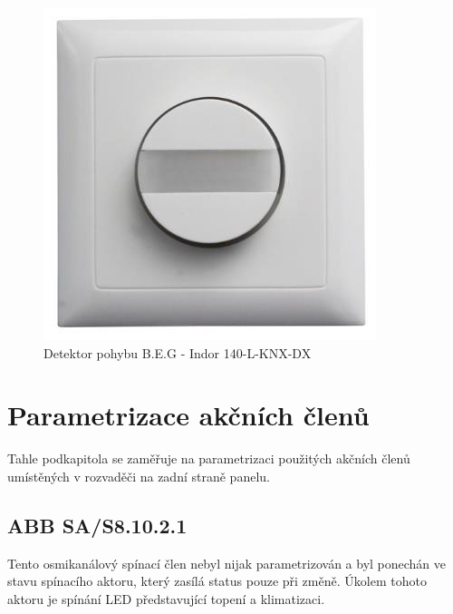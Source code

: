 \begin{figure}[!ht]
  \begin{center}
    \includegraphics[scale=0.45]{obrazky/BEG.png}
  \end{center}
  \caption[Detektor pohybu B.E.G - Indor 140-L-KNX-DX \cite{Mitrenga}]{Detektor pohybu B.E.G - Indor 140-L-KNX-DX  \cite{Mitrenga}}
  \label{fig:Detektor pohybu B.E.G - Indor 140-L-KNX-DX }
\end{figure}

\section{Parametrizace akčních členů}
Tahle podkapitola se zaměřuje na parametrizaci použitých akčních členů umístěných v rozvaděči na zadní straně panelu.
\subsection{ABB SA/S8.10.2.1}
Tento osmikanálový spínací člen nebyl nijak parametrizován a byl ponechán ve stavu spínacího aktoru, který zasílá status pouze při změně. Úkolem tohoto aktoru je spínání LED představující topení a klimatizaci.

